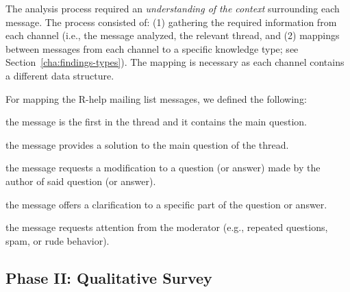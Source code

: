 
The analysis process required an \textit{understanding of the context} surrounding each message. The process consisted of: (1) gathering the required information from each channel (i.e., the message analyzed, the relevant thread, and (2) mappings between messages from each channel to a specific knowledge type; see Section~\ref{cha:findings-types}). The mapping is necessary as each channel contains a different data structure.

For mapping the R-help mailing list messages, we defined the following:

	\begin{description}[itemsep=1pt, topsep=2pt, leftmargin=1em, parsep=0pt]
		\item[Question:] the message is the first in the thread and it contains the main question.
		\item[Answer:] the message provides a solution to the main question of the thread.
	 	\item[Update:] the message requests a modification to a question (or answer) made by the author of said question (or answer).
		\item[Comment:] the message offers a clarification to a specific part of the question or answer.
		\item[Flag:] the message requests attention from the moderator (e.g., repeated questions, spam, or rude behavior).
	\end{description}


\subsection{Phase II: Qualitative Survey} 


